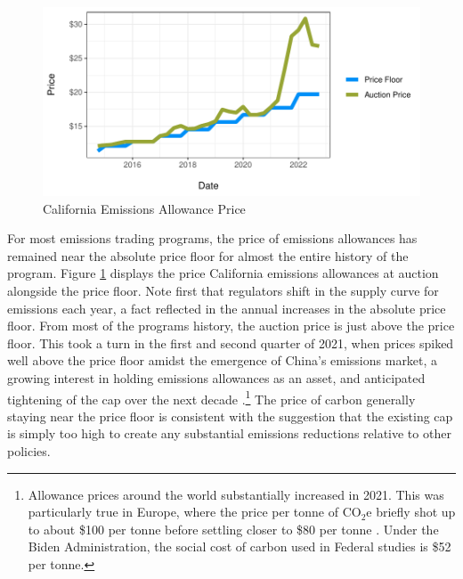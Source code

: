 \begin{figure}
    \centering
    \caption{California Emissions Allowance Price \label{allowance_pr}}
    \includegraphics[width=\textwidth]{figures/chapter3_figures/allowance_prices.pdf}
\end{figure}

For most emissions trading programs, the price of emissions allowances has remained near the absolute price floor for almost the entire history of the program. Figure \ref{allowance_pr} displays the price California emissions allowances at auction alongside the price floor. Note first that regulators shift in the supply curve for emissions each year, a fact reflected in the annual increases in the absolute price floor. From most of the programs history, the auction price is just above the price floor. This took a turn in the first and second quarter of 2021, when prices spiked well above the price floor amidst the emergence of China's emissions market, a growing interest in holding emissions allowances as an asset, and anticipated tightening of the cap over the next decade \citep{storrow2022price}.\footnote{Allowance prices around the world substantially increased in 2021. This was particularly true in Europe, where the price per tonne of CO$_2$e briefly shot up to about \$100 per tonne before settling closer to \$80 per tonne \citep{manzagol2022global}. Under the Biden Administration, the social cost of carbon used in Federal studies is \$52 per tonne.} The price of carbon generally staying near the price floor is consistent with the suggestion that the existing cap is simply too high to create any substantial emissions reductions relative to other policies. 

